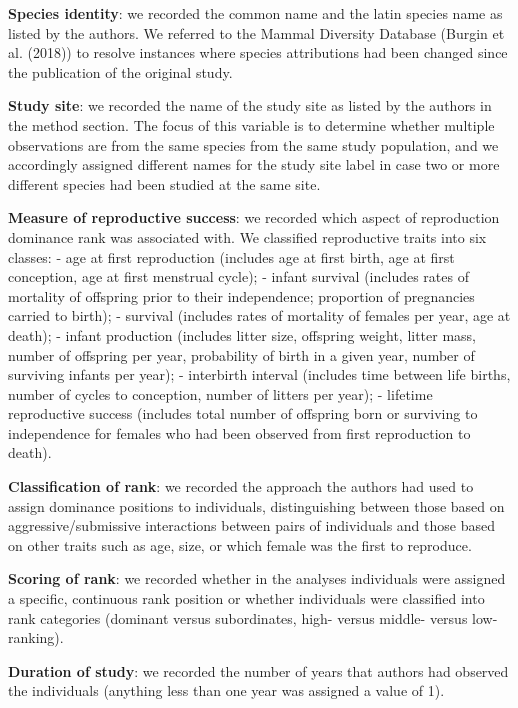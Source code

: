 \documentclass[]{article}
\begin{document}
\textbf{Species identity}: we recorded the common name and the latin
species name as listed by the authors. We referred to the Mammal
Diversity Database (Burgin et al. (2018)) to resolve instances where
species attributions had been changed since the publication of the
original study.

\textbf{Study site}: we recorded the name of the study site as listed by
the authors in the method section. The focus of this variable is to
determine whether multiple observations are from the same species from
the same study population, and we accordingly assigned different names
for the study site label in case two or more different species had been
studied at the same site.

\textbf{Measure of reproductive success}: we recorded which aspect of
reproduction dominance rank was associated with. We classified
reproductive traits into six classes: - age at first reproduction
(includes age at first birth, age at first conception, age at first
menstrual cycle); - infant survival (includes rates of mortality of
offspring prior to their independence; proportion of pregnancies carried
to birth); - survival (includes rates of mortality of females per year,
age at death); - infant production (includes litter size, offspring
weight, litter mass, number of offspring per year, probability of birth
in a given year, number of surviving infants per year); - interbirth
interval (includes time between life births, number of cycles to
conception, number of litters per year); - lifetime reproductive success
(includes total number of offspring born or surviving to independence
for females who had been observed from first reproduction to death).

\textbf{Classification of rank}: we recorded the approach the authors
had used to assign dominance positions to individuals, distinguishing
between those based on aggressive/submissive interactions between pairs
of individuals and those based on other traits such as age, size, or
which female was the first to reproduce.

\textbf{Scoring of rank}: we recorded whether in the analyses
individuals were assigned a specific, continuous rank position or
whether individuals were classified into rank categories (dominant
versus subordinates, high- versus middle- versus low-ranking).

\textbf{Duration of study}: we recorded the number of years that authors
had observed the individuals (anything less than one year was assigned a
value of 1).
\end{document}
